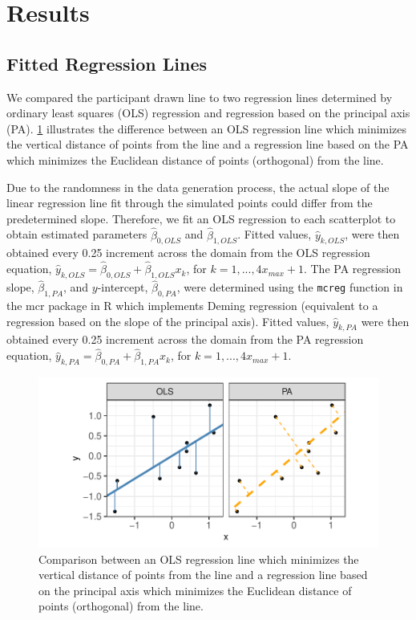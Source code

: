 \documentclass[12pt]{article}
\begin{document}
\hypertarget{results}{%
\section{Results}\label{results}}

\hypertarget{fitted-regression-lines}{%
\subsection{Fitted Regression Lines}\label{fitted-regression-lines}}

We compared the participant drawn line to two regression lines
determined by ordinary least squares (OLS) regression and regression
based on the principal axis (PA). \cref{fig:ols-vs-pca-example}
illustrates the difference between an OLS regression line which
minimizes the vertical distance of points from the line and a regression
line based on the PA which minimizes the Euclidean distance of points
(orthogonal) from the line.

Due to the randomness in the data generation process, the actual slope
of the linear regression line fit through the simulated points could
differ from the predetermined slope. Therefore, we fit an OLS regression
to each scatterplot to obtain estimated parameters \(\hat\beta_{0,OLS}\)
and \(\hat\beta_{1,OLS}\). Fitted values, \(\hat y_{k,OLS}\), were then
obtained every 0.25 increment across the domain from the OLS regression
equation,
\(\hat y_{k,OLS} = \hat\beta_{0,OLS} + \hat\beta_{1,OLS} x_k\), for
\(k = 1, ..., 4 x_{max} +1\). The PA regression slope,
\(\hat\beta_{1,PA}\), and \(y\)-intercept, \(\hat\beta_{0,PA}\), were
determined using the \texttt{mcreg} function in the mcr package in R
\citep{mcr_pkg} which implements Deming regression (equivalent to a
regression based on the slope of the principal axis). Fitted values,
\(\hat y_{k,PA}\) were then obtained every 0.25 increment across the
domain from the PA regression equation,
\(\hat y_{k,PA} = \hat\beta_{0,PA} + \hat\beta_{1,PA} x_k\), for
\(k = 1, ..., 4 x_{max} +1\).

\begin{figure}[tbp]

{\centering \includegraphics[width=0.8\linewidth,]{Eye-Fitting-Straight-Lines-in-the-Modern-Era_files/figure-latex/ols-vs-pca-example-1} 

}

\caption{ Comparison between an OLS regression line which minimizes the vertical distance of points from the line and a regression line based on the principal axis which minimizes the Euclidean distance of points (orthogonal) from the line.}\label{fig:ols-vs-pca-example}
\end{figure}
\end{document}
